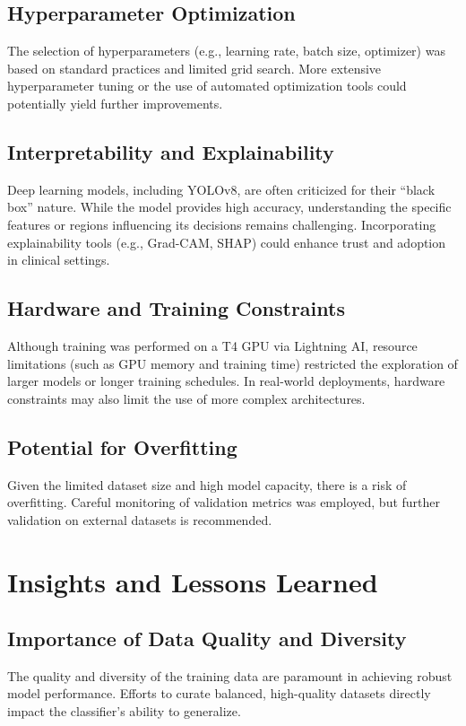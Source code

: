 \documentclass[a4paper,12pt]{report}
\begin{document}
\begin{spacing}{1.5}
        \subsection*{Hyperparameter Optimization}
        The selection of hyperparameters (e.g., learning rate, batch size, optimizer) was based on standard practices and limited grid search. More extensive hyperparameter tuning or the use of automated optimization tools could potentially yield further improvements.
        
        \subsection*{Interpretability and Explainability}
        Deep learning models, including YOLOv8, are often criticized for their “black box” nature. While the model provides high accuracy, understanding the specific features or regions influencing its decisions remains challenging. Incorporating explainability tools (e.g., Grad-CAM, SHAP) could enhance trust and adoption in clinical settings.
        
        \subsection*{Hardware and Training Constraints}
        Although training was performed on a T4 GPU via Lightning AI, resource limitations (such as GPU memory and training time) restricted the exploration of larger models or longer training schedules. In real-world deployments, hardware constraints may also limit the use of more complex architectures.
        
        \subsection*{Potential for Overfitting}
        Given the limited dataset size and high model capacity, there is a risk of overfitting. Careful monitoring of validation metrics was employed, but further validation on external datasets is recommended.
    \newpage

    \section{Insights and Lessons Learned}
    
        \subsection*{Importance of Data Quality and Diversity}
        The quality and diversity of the training data are paramount in achieving robust model performance. Efforts to curate balanced, high-quality datasets directly impact the classifier’s ability to generalize.
        

\end{spacing}
\end{document}
